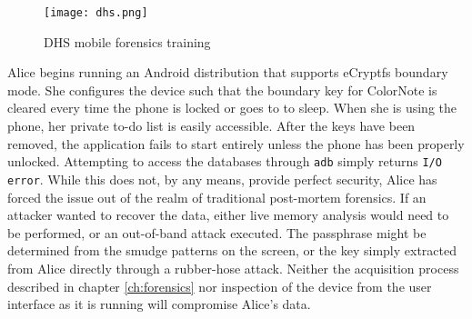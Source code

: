 \begin{figure}[htb]
\begin{center}
\texttt{[image: dhs.png]}
\end{center}
\caption{DHS mobile forensics training} 
\label{fig:dhs}
\end{figure}

Alice begins running an Android distribution that supports eCryptfs boundary mode. She configures the device such that the boundary
key for ColorNote is cleared every time the phone is locked or goes to to sleep. When she is using the phone, her private to-do list
is easily accessible. After the keys have been removed, the application fails to start entirely unless the phone has been properly
unlocked. Attempting to access the databases through \texttt{adb} simply returns \texttt{I/O error}. While this does not, by any
means, provide perfect security, Alice has forced the issue out of the realm of traditional post-mortem forensics. If an attacker
wanted to recover the data, either live memory analysis would need to be performed, or an out-of-band attack executed. The
passphrase might be determined from the smudge patterns on the screen, or the key simply extracted from Alice directly through a
rubber-hose attack. Neither the acquisition process described in chapter \ref{ch:forensics} nor inspection of the device from the
user interface as it is running will compromise Alice's data.
